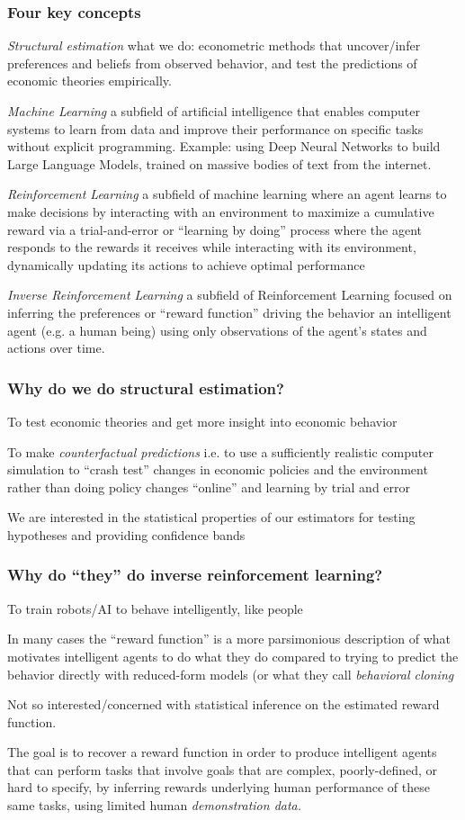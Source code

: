 \documentclass[10pt,english,t,handout]{beamer}
\begin{document}
\begin{frame} \frametitle{Four key concepts}
\bi
\item {\it Structural estimation} what we do: econometric methods 
that uncover/infer preferences and beliefs from observed behavior, and  test the predictions of economic theories empirically. 
\item {\it Machine Learning\/} a subfield of artificial intelligence that enables computer systems to learn from data and improve their performance on specific tasks without explicit programming. Example: using Deep Neural Networks to build Large Language Models, trained on massive
bodies of text from the internet.
\item {\it Reinforcement Learning\/} a subfield of machine learning where an agent learns to make decisions by interacting with an environment to maximize a cumulative reward via a trial-and-error or ``learning by doing'' process where the agent responds to the rewards
it receives while interacting with its environment, dynamically updating its actions to achieve optimal performance
\item {\it Inverse Reinforcement Learning} a subfield of Reinforcement Learning focused on inferring the preferences or
``reward function'' driving the behavior an intelligent agent (e.g. a human being) using only observations of the agent's
states and actions over time.
\ei
\end{frame}

\begin{frame} \frametitle{Why do we do structural estimation?}
\bi
\item To test economic theories and get more insight into economic behavior
\item To make {\it counterfactual predictions} i.e. to use a sufficiently realistic
computer simulation to ``crash test'' changes in economic policies and the environment
rather than doing policy changes ``online'' and learning by trial and error
\item We are interested in the statistical properties of our estimators for testing hypotheses
and providing confidence bands
\ei
\end{frame}

\begin{frame} \frametitle{Why do ``they'' do inverse reinforcement learning?}
\bi
\item To train robots/AI to behave intelligently, like people
\item In many cases the ``reward function'' is a more parsimonious description of what motivates
intelligent agents to do what they do compared to trying to predict the behavior directly with 
reduced-form models (or what they call {\it behavioral cloning\/}
\item Not so interested/concerned with statistical inference on the estimated reward function.
\item The goal is to  recover a reward function in order to produce
intelligent agents that can perform tasks that
involve goals that are complex, poorly-defined, or hard to specify, by inferring rewards
underlying human performance of these same tasks, using limited human {\it demonstration data.\/} 
\ei
\end{frame}
\end{document}

